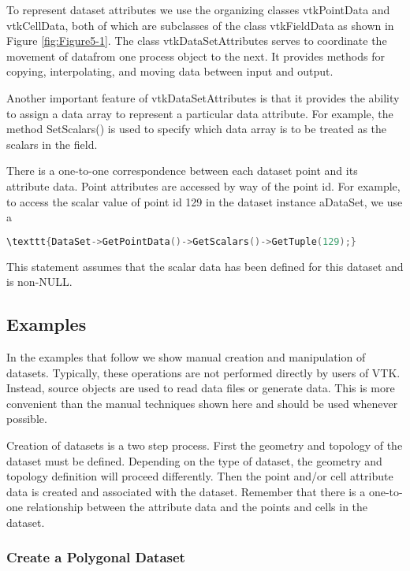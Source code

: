 To represent dataset attributes we use the organizing classes vtkPointData and vtkCellData, both of which are subclasses of the class vtkFieldData as shown in Figure \ref{fig:Figure5-1}. The class vtkDataSetAttributes serves to coordinate the movement of datafrom one process object to the next. It provides methods for copying, interpolating, and moving data between input and output.

Another important feature of vtkDataSetAttributes is that it provides the ability to assign a data array to represent a particular data attribute. For example, the method SetScalars() is used to specify which data array is to be treated as the scalars in the field.

There is a one-to-one correspondence between each dataset point and its attribute data. Point attributes are accessed by way of the point id. For example, to access the scalar value of point id 129 in the dataset instance aDataSet, we use a

\begin{lstlisting}[language=C++,  caption={}, numbers=none, frame=none]
\texttt{DataSet->GetPointData()->GetScalars()->GetTuple(129);}
\end{lstlisting}

This statement assumes that the scalar data has been defined for this dataset and is non-NULL.

\subsection{Examples}

In the examples that follow we show manual creation and manipulation of datasets. Typically, these operations are not performed directly by users of VTK. Instead, source objects are used to read data files or generate data. This is more convenient than the manual techniques shown here and should be used whenever possible.

Creation of datasets is a two step process. First the geometry and topology of the dataset must be defined. Depending on the type of dataset, the geometry and topology definition will proceed differently. Then the point and/or cell attribute data is created and associated with the dataset. Remember that there is a one-to-one relationship between the attribute data and the points and cells in the dataset.



\subsubsection{Create a Polygonal Dataset}

